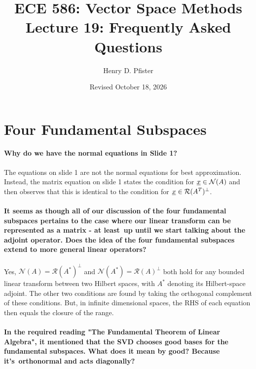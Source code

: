 \documentclass[10pt,english]{article}
\begin{document}
\title{ECE 586: Vector Space Methods \\ Lecture 19: Frequently Asked Questions}
\author{Henry D. Pfister \\ \univ}
\date{Revised October 18, 2026}

\maketitle

\section{Four Fundamental Subspaces}

\paragraph{Why do we have the normal equations in Slide 1?}

The equations on slide 1 are not the normal equations for best approximation.
Instead, the matrix equation on slide 1 states the condition for $\underline{x} \in \mathcal{N}(A)$ and then observes that this is identical to the condition for $\underline{x} \in \mathcal{R}(A^T)^\perp$.

\paragraph{It seems as though all of our discussion of the four fundamental subspaces pertains to the case where our linear transform can be represented as a matrix - at least up until we start talking about the adjoint operator. Does the idea of the four fundamental subspaces extend to more general linear operators?}

Yes, $\mathcal{N}(A)=\mathcal{R}(A^*)^\perp$ and $\mathcal{N}(A^*)=\mathcal{R}(A)^\perp$ both hold for any bounded linear transform between two Hilbert spaces, with $A^*$ denoting its Hilbert-space adjoint.
The other two conditions are found by taking the orthogonal complement of these conditions.
But, in infinite dimensional spaces, the RHS of each equation then equals the closure of the range.


\paragraph{In the required reading "The Fundamental Theorem of Linear Algebra", it mentioned that the SVD chooses good bases for the fundamental subspaces. What does it mean by good? Because it's orthonormal and acts diagonally?}
\end{document}
